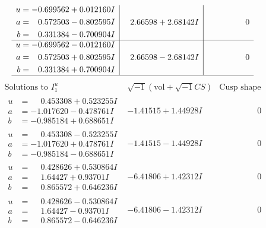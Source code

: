 \documentclass[1p]{elsarticle_modified}
\theoremstyle{definition}
\newcommand{\I}{\sqrt{-1}}
\begin{document}
$$\begin{array}{c|c|c}
\begin{aligned}
u &= -0.699562 + 0.012160 I \\
a &= \phantom{-}0.572503 - 0.802595 I \\
b &= \phantom{-}0.331384 - 0.700904 I\end{aligned}
 & \phantom{-}2.66598 + 2.68142 I & \phantom{-0.000000 } 0 \\ \hline\begin{aligned}
u &= -0.699562 - 0.012160 I \\
a &= \phantom{-}0.572503 + 0.802595 I \\
b &= \phantom{-}0.331384 + 0.700904 I\end{aligned}
 & \phantom{-}2.66598 - 2.68142 I & \phantom{-0.000000 } 0\\
 \hline 
 \end{array}$$\newpage$$\begin{array}{c|c|c}  
\text{Solutions to }I^u_{1}& \I (\text{vol} + \sqrt{-1}CS) & \text{Cusp shape}\\
 \hline 
\begin{aligned}
u &= \phantom{-}0.453308 + 0.523255 I \\
a &= -1.017620 - 0.478761 I \\
b &= -0.985184 + 0.688651 I\end{aligned}
 & -1.41515 + 1.44928 I & \phantom{-0.000000 } 0 \\ \hline\begin{aligned}
u &= \phantom{-}0.453308 - 0.523255 I \\
a &= -1.017620 + 0.478761 I \\
b &= -0.985184 - 0.688651 I\end{aligned}
 & -1.41515 - 1.44928 I & \phantom{-0.000000 } 0 \\ \hline\begin{aligned}
u &= \phantom{-}0.428626 + 0.530864 I \\
a &= \phantom{-}1.64427 + 0.93701 I \\
b &= \phantom{-}0.865572 + 0.646236 I\end{aligned}
 & -6.41806 + 1.42312 I & \phantom{-0.000000 } 0 \\ \hline\begin{aligned}
u &= \phantom{-}0.428626 - 0.530864 I \\
a &= \phantom{-}1.64427 - 0.93701 I \\
b &= \phantom{-}0.865572 - 0.646236 I\end{aligned}
 & -6.41806 - 1.42312 I & \phantom{-0.000000 } 0 \\ \hline\begin{aligned}

\end{aligned}
\end{array}$$
\end{document}
